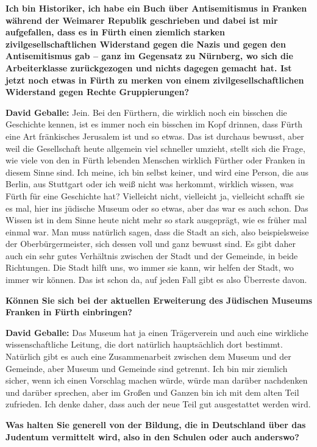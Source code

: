 \textbf{Ich bin Historiker, ich habe ein Buch über Antisemitismus in Franken während der Weimarer Republik geschrieben und dabei ist mir aufgefallen, dass es in Fürth einen ziemlich starken zivilgesellschaftlichen Widerstand gegen die Nazis und gegen den Antisemitismus gab – ganz im Gegensatz zu Nürnberg, wo sich die Arbeiterklasse zurückgezogen und nichts dagegen gemacht hat. Ist jetzt noch etwas in Fürth zu merken von einem zivilgesellschaftlichen Widerstand gegen Rechte Gruppierungen?} 

\textbf{David Geballe:} Jein. Bei den Fürthern, die wirklich noch ein bisschen die Geschichte kennen, ist es immer noch ein bisschen im Kopf drinnen, dass Fürth eine Art fränkisches Jerusalem ist und so etwas. Das ist durchaus bewusst, aber weil die Gesellschaft heute allgemein viel schneller umzieht, stellt sich die Frage, wie viele von den in Fürth lebenden Menschen wirklich Fürther oder Franken in diesem Sinne sind. Ich meine, ich bin selbst keiner, und wird eine Person, die aus Berlin, aus Stuttgart oder ich weiß nicht was herkommt, wirklich wissen, was Fürth für eine Geschichte hat? Vielleicht nicht, vielleicht ja, vielleicht schafft sie es mal, hier ins jüdische Museum oder so etwas, aber das war es auch schon. Das Wissen ist in dem Sinne heute nicht mehr so stark ausgeprägt, wie es früher mal einmal war. Man muss natürlich sagen, dass die Stadt an sich, also beispielsweise der Oberbürgermeister, sich dessen voll und ganz bewusst sind. Es gibt daher auch ein sehr gutes Verhältnis zwischen der Stadt und der Gemeinde, in beide Richtungen. Die Stadt hilft uns, wo immer sie kann, wir helfen der Stadt, wo immer wir können. Das ist schon da, auf jeden Fall gibt es also Überreste davon. 

\textbf{Können Sie sich bei der aktuellen Erweiterung des Jüdischen Museums Franken in Fürth einbringen?}

\textbf{David Geballe:} Das Museum hat ja einen Trägerverein und auch eine wirkliche wissenschaftliche Leitung, die dort natürlich hauptsächlich dort bestimmt. Natürlich gibt es auch eine Zusammenarbeit zwischen dem Museum und der Gemeinde, aber Museum und Gemeinde sind getrennt. Ich bin mir ziemlich sicher, wenn ich einen Vorschlag machen würde, würde man darüber nachdenken und darüber sprechen, aber im Großen und Ganzen bin ich mit dem alten Teil zufrieden. Ich denke daher, dass auch der neue Teil gut ausgestattet werden wird. 

\textbf{Was halten Sie generell von der Bildung, die in Deutschland über das Judentum vermittelt wird, also in den Schulen oder auch anderswo?} 


